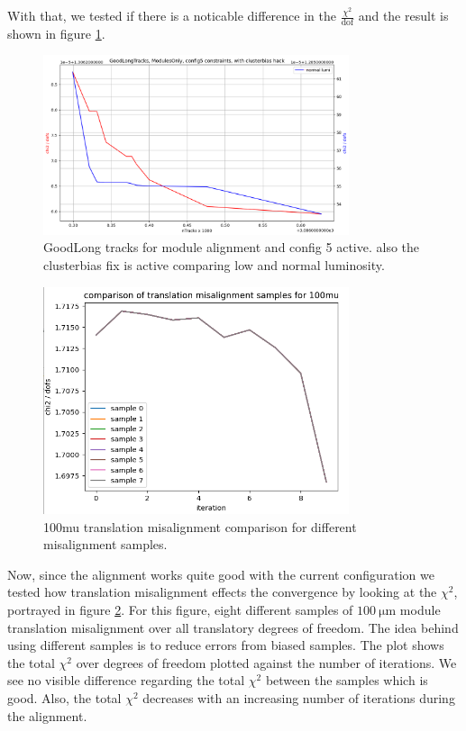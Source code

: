 With that, we tested if there is a noticable difference in the $\frac{\chi^2}{\text{dof}}$
and the result is shown in figure \ref{fig:GL_lumi_low_normal_hack_on}.

\begin{figure}
  \centering
  \includegraphics[width=0.8\textwidth]{plots/feb_2_2022/GL_modules_c5_cb_hackactive_low_normal_lumi.png}
  \caption{GoodLong tracks for module alignment and config 5 active. also the clusterbias fix is active comparing low and normal luminosity.}
  \label{fig:GL_lumi_low_normal_hack_on}
\end{figure}

\begin{figure}
  \centering
  \includegraphics[width=0.8\textwidth]{plots/feb_6_2022/100mu_misalignment_samples_compared.png}
  \caption{100mu translation misalignment comparison for different misalignment samples.}
  \label{fig:100muT}
\end{figure}

Now, since the alignment works quite good with the current configuration we
tested how translation misalignment effects the convergence by looking at the
$\chi^2$, portrayed in figure \ref{fig:100muT}. For this figure, eight different samples of $\SI{100}{\micro\metre}$ module translation misalignment over all translatory
degrees of freedom. The idea behind using different samples is to reduce errors
from biased samples. The plot shows the total $\chi^2$ over degrees of freedom
plotted against the number of iterations. We see no visible difference regarding
the total $\chi^2$ between the samples which is good.
Also, the total $\chi^2$ decreases with an increasing number of iterations
during the alignment.

